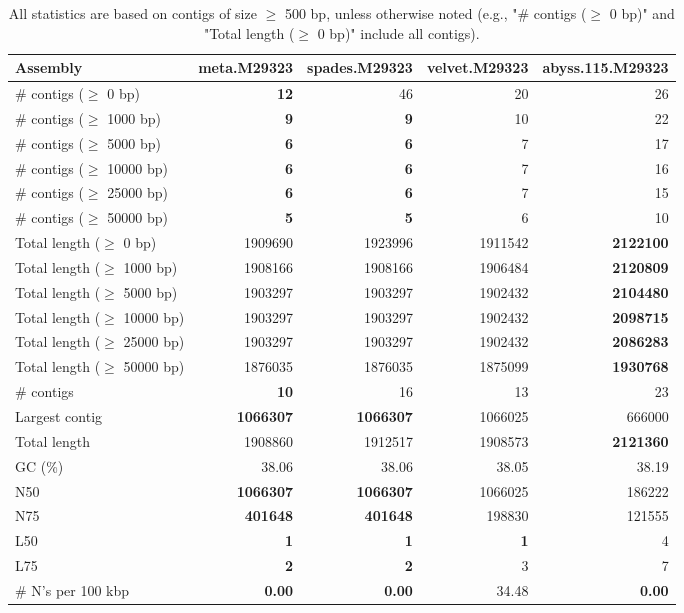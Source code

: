 \documentclass[12pt,a4paper]{article}
\begin{document}
\begin{table}[ht]
\begin{center}
\caption{All statistics are based on contigs of size $\geq$ 500 bp, unless otherwise noted (e.g., "\# contigs ($\geq$ 0 bp)" and "Total length ($\geq$ 0 bp)" include all contigs).}
\begin{tabular}{|l*{4}{|r}|}
\hline
Assembly & meta.M29323 & spades.M29323 & velvet.M29323 & abyss.115.M29323 \\ \hline
\# contigs ($\geq$ 0 bp) & {\bf 12} & 46 & 20 & 26 \\ \hline
\# contigs ($\geq$ 1000 bp) & {\bf 9} & {\bf 9} & 10 & 22 \\ \hline
\# contigs ($\geq$ 5000 bp) & {\bf 6} & {\bf 6} & 7 & 17 \\ \hline
\# contigs ($\geq$ 10000 bp) & {\bf 6} & {\bf 6} & 7 & 16 \\ \hline
\# contigs ($\geq$ 25000 bp) & {\bf 6} & {\bf 6} & 7 & 15 \\ \hline
\# contigs ($\geq$ 50000 bp) & {\bf 5} & {\bf 5} & 6 & 10 \\ \hline
Total length ($\geq$ 0 bp) & 1909690 & 1923996 & 1911542 & {\bf 2122100} \\ \hline
Total length ($\geq$ 1000 bp) & 1908166 & 1908166 & 1906484 & {\bf 2120809} \\ \hline
Total length ($\geq$ 5000 bp) & 1903297 & 1903297 & 1902432 & {\bf 2104480} \\ \hline
Total length ($\geq$ 10000 bp) & 1903297 & 1903297 & 1902432 & {\bf 2098715} \\ \hline
Total length ($\geq$ 25000 bp) & 1903297 & 1903297 & 1902432 & {\bf 2086283} \\ \hline
Total length ($\geq$ 50000 bp) & 1876035 & 1876035 & 1875099 & {\bf 1930768} \\ \hline
\# contigs & {\bf 10} & 16 & 13 & 23 \\ \hline
Largest contig & {\bf 1066307} & {\bf 1066307} & 1066025 & 666000 \\ \hline
Total length & 1908860 & 1912517 & 1908573 & {\bf 2121360} \\ \hline
GC (\%) & 38.06 & 38.06 & 38.05 & 38.19 \\ \hline
N50 & {\bf 1066307} & {\bf 1066307} & 1066025 & 186222 \\ \hline
N75 & {\bf 401648} & {\bf 401648} & 198830 & 121555 \\ \hline
L50 & {\bf 1} & {\bf 1} & {\bf 1} & 4 \\ \hline
L75 & {\bf 2} & {\bf 2} & 3 & 7 \\ \hline
\# N's per 100 kbp & {\bf 0.00} & {\bf 0.00} & 34.48 & {\bf 0.00} \\ \hline
\end{tabular}
\end{center}
\end{table}
\end{document}
